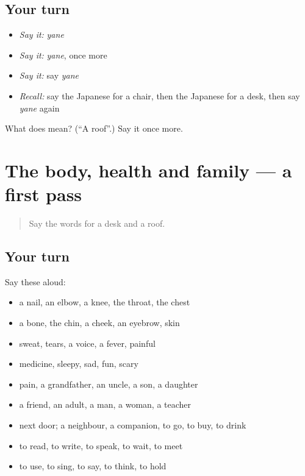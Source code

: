 \subsection*{Your turn}
\begin{itemize}
\raggedright
  \item \emph{Say it:} \emph{yane}
  \item \emph{Say it:} \emph{yane}, once more
  \item \emph{Say it:} say \emph{yane}
  \item \emph{Recall:} say the Japanese for a chair, then the Japanese for a desk, then say \emph{yane} again
\end{itemize}

\begin{tcolorbox}[breakable,colback=teal!4,colframe=teal!35!black,title={Before you move on}]
What does  mean? (\textquotedblleft{}A roof\textquotedblright{}.) Say it once more.
\end{tcolorbox}
\section[(dialogue)]{The body, health and family — a first pass}

\label{lesson:JA-R37-first-pass-the-body-health-and-family}



\begin{quote}
Say the words for a desk and a roof.
\end{quote}

\subsection*{Your turn}
Say these aloud:

\begin{itemize}
\raggedright
  \item a nail, an elbow, a knee, the throat, the chest
  \item a bone, the chin, a cheek, an eyebrow, skin
  \item sweat, tears, a voice, a fever, painful
  \item medicine, sleepy, sad, fun, scary
  \item pain, a grandfather, an uncle, a son, a daughter
  \item a friend, an adult, a man, a woman, a teacher
  \item next door; a neighbour, a companion, to go, to buy, to drink
  \item to read, to write, to speak, to wait, to meet
  \item to use, to sing, to say, to think, to hold
\end{itemize}

